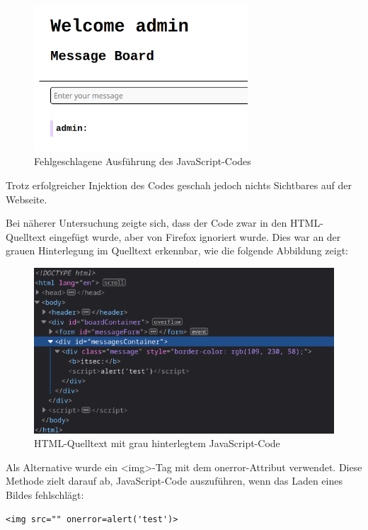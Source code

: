 \documentclass[
    a4paper,
    pagesize,
	pdftex,
    12pt,
]{scrartcl}
\begin{document}
\begin{figure}[H]
	\centering
	\includegraphics[width=8cm]{xss-script-injection-fail.png}
	\caption{Fehlgeschlagene Ausführung des JavaScript-Codes}
	\label{fig:xss-script-injection-fail}
\end{figure}

\noindent Trotz erfolgreicher Injektion des Codes geschah jedoch nichts Sichtbares auf der Webseite.

\noindent Bei näherer Untersuchung zeigte sich, dass der Code zwar in den HTML-Quelltext eingefügt wurde, aber von Firefox ignoriert wurde. Dies war an der grauen Hinterlegung im Quelltext erkennbar, wie die folgende Abbildung zeigt:

\begin{figure}[H]
	\centering
	\includegraphics[width=12cm]{xss-script-injection-html.png}
	\caption{HTML-Quelltext mit grau hinterlegtem JavaScript-Code}
	\label{fig:xss-script-injection-html}
\end{figure}

\noindent Als Alternative wurde ein <img>-Tag mit dem onerror-Attribut verwendet. Diese Methode zielt darauf ab, JavaScript-Code auszuführen, wenn das Laden eines Bildes fehlschlägt:
\begin{lstlisting}[breaklines]
	<img src="" onerror=alert('test')>
\end{lstlisting}
\end{document}
